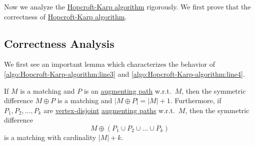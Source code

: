 Now we analyze the \hyperref[algo:Hopcroft-Karp-algorithm]{Hopcroft-Karp algorithm} rigorously. We first prove that the correctness of \hyperref[algo:Hopcroft-Karp-algorithm]{Hopcroft-Karp algorithm}.

\subsection{Correctness Analysis}
We first see an important lemma which characterizes the behavior of \autoref{algo:Hopcroft-Karp-algorithm:line3} and \autoref{algo:Hopcroft-Karp-algorithm:line4}.
\begin{lemma}\label{lma:lec25-1}
	If \(M\) is a matching and \(P\) is an \hyperref[def:augmenting-path]{augmenting path} w.r.t.\ \(M\), then the symmetric difference
	\(M\oplus P\) is a matching and \(\left\vert M\oplus P \right\vert = \left\vert M \right\vert + 1\). Furthermore, if
	\(P_1, P_2, \dots  , P_k\) are \hyperref[def:vertex-independent]{vertex-disjoint} \hyperref[def:augmenting-path]{augmenting paths}
	w.r.t.\ \(M\), then the symmetric difference
	\[
		M\oplus(P_1 \cup P_2 \cup  \dots  \cup  P_k  )
	\]
	is a matching with cardinality \(\left\vert M \right\vert + k\).
\end{lemma}
